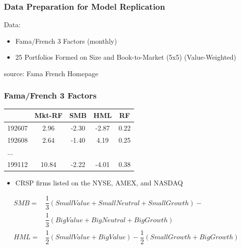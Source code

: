 \documentclass{beamer}
\begin{document}
\begin{frame}
\frametitle{Data Preparation for Model Replication}
Data:
\begin{itemize}
\item Fama/French 3 Factors (monthly)	
\item 25 Portfolios Formed on Size and Book-to-Market (5x5) (Value-Weighted)
\end{itemize}


source: Fama French Homepage

\end{frame}

\begin{frame}
\frametitle{Fama/French 3 Factors}
\begin{table}
\begin{tabular}{ | l | c | c | c | c | }
\hline
 & Mkt-RF & SMB & HML & RF \\ \hline
192607 & 2.96 & -2.30 & -2.87 & 0.22\\ \hline
192608 & 2.64 & -1.40 & 4.19 & 0.25\\ \hline
... & & & & \\ \hline
199112 & 10.84 & -2.22 & -4.01 & 0.38\\ \hline
\end{tabular}
\end{table}
\begin{itemize}
\item CRSP firms listed on the NYSE, AMEX, and NASDAQ
\end{itemize}
\begin{align*}
SMB = &\dfrac{1}{3} (Small Value + Small Neutral + Small Growth) -\\
&\dfrac{1}{3} (Big Value + Big Neutral + Big Growth)\\
HML = &\dfrac{1}{2} (Small Value + Big Value) - \dfrac{1}{2}(Small Growth + Big Growth)\\
\end{align*}


\end{frame}
\end{document}
